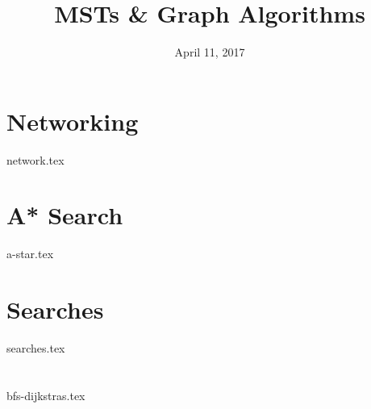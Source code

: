\documentclass[11pt]{exam}
\title{MSTs \& Graph Algorithms}
\date{April 11, 2017}
\begin{document}
\maketitle

\section{Networking}
\begin{questions}
{network.tex}
\end{questions}

\clearpage

\section{A* Search}
\begin{questions}
{a-star.tex}
\end{questions}

\clearpage

\section{Searches}
\begin{questions}
{searches.tex}
\end{questions}

\section{}
\begin{questions}
{bfs-dijkstras.tex}
\end{questions}
\end{document}
